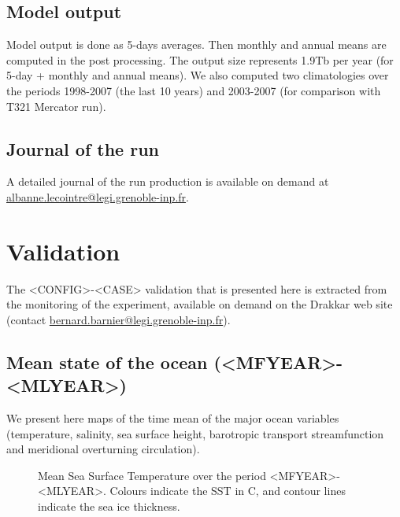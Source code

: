 \documentclass[12pt]{article}
\begin{document}
\subsection{Model output}

Model output is done as 5-days averages. Then monthly and annual means are computed in the post processing. The output size represents 1.9Tb per year (for 5-day + monthly and annual means). We also computed two climatologies over the periods 1998-2007 (the last 10 years) and 2003-2007 (for comparison with T321 Mercator run).

\subsection{Journal of the run}

A detailed journal of the run production is available on demand at \href{mailto:albanne.lecointre@legi.grenoble-inp.fr}{albanne.lecointre@legi.grenoble-inp.fr}.


\section{Validation}

The <CONFIG>-<CASE> validation that is presented here is extracted from the monitoring of the experiment, available on demand on the Drakkar web site (contact \href{mailto:bernard.barnier@legi.grenoble-inp.fr}{bernard.barnier@legi.grenoble-inp.fr}).

\subsection{Mean state of the ocean (<MFYEAR>-<MLYEAR>)}

We present here maps of the time mean of the major ocean variables (temperature, salinity, sea surface height, barotropic transport streamfunction and meridional overturning circulation).

\begin{figure}[H]
\begin{center}
\caption{Mean Sea Surface Temperature over the period <MFYEAR>-<MLYEAR>. Colours indicate the SST in \degres C, and contour lines indicate the sea ice thickness.}
\end{center}
\end{figure}
\end{document}
